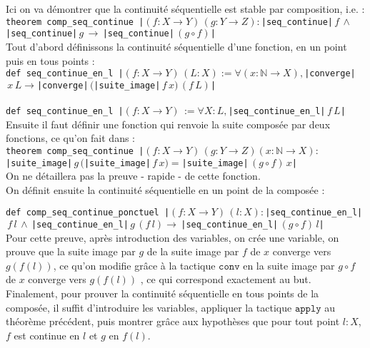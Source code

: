 Ici on va démontrer que la continuité séquentielle est stable par composition, i.e. : \\
\texttt{theorem comp_seq_continue |$(f : X \to Y) \,(g : Y \to Z) :$|seq_continue|$\, f \, \land \, $|seq_continue|$ \, g \, \to \,$|seq_continue|$ \, (g \circ f)$|} \\
Tout d'abord définissons la continuité séquentielle d'une fonction, en un point puis en tous points : \\
\texttt{def seq_continue_en_l |$(f : X \to Y) \,(L : X) := \forall (x:\mathbb{N}\to X),$|converge|$ \, x \, L \to$|converge|$ \, ($|suite_image|$ \, f \, x)\, (f \, L)$|} \\ 
\\
\texttt{def seq_continue_en_l |$(f : X \to Y) \, := \forall X : L,$|seq_continue_en_l|$ \, f \, L$|}\\

Ensuite il faut définir une fonction qui renvoie la suite composée par deux fonctions, ce qu'on fait dans : \\
\texttt{theorem comp_seq_continue |$(f : X \to Y) \,(g : Y \to Z)(x : \mathbb{N} \to X) :$|suite_image|$\, g \, ($|suite_image|$ \, f \,x) = $|suite_image|$ \, (g \circ f) \, x$|} \\
On ne détaillera pas la preuve - rapide - de cette fonction.\\
On définit ensuite la continuité séquentielle en un point de la composée : 

\texttt{def comp_seq_continue_ponctuel |$(f : X \to Y) \,(l : X) :$|seq_continue_en_l|$\, f \, l \, \land \, $|seq_continue_en_l|$ \, g \, (f \, l) \to \,$|seq_continue_en_l|$ \, (g \circ f) \, l$|} \\

Pour cette preuve, après introduction des variables, on crée une variable, on prouve que la suite image par $g$ de la suite image par $f$ de $x$ converge vers $g(f(l))$, ce qu'on modifie grâce à la tactique $\texttt{conv}$ en \og{}la suite image par $g \circ f$ de $x$ converge vers $g(f(l))$ \fg{}, ce qui correspond exactement au but.\\

Finalement, pour prouver la continuité séquentielle en tous points de la composée, il suffit d'introduire les variables, appliquer la tactique $\texttt{apply}$ au théorème précédent, puis montrer grâce aux hypothèses que pour tout point $l:X$, $f$ est continue en $l$ et $g$ en $f(l)$.\\
